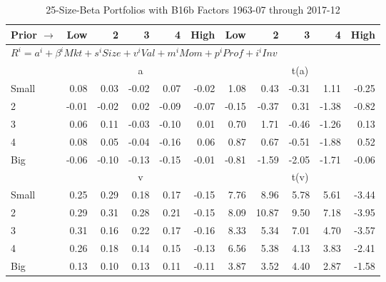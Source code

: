 
\begin{table}[!ht]
\footnotesize
\centering
\caption{25-Size-Beta Portfolios with B16b Factors 1963-07 through 2017-12}
\begin{tabular}{lrrrrrrrrrr}
  \toprule
    Prior $\rightarrow$ & Low & 2 & 3 & 4 & High & Low & 2 & 3 & 4 & High \\ 
  \midrule
  \multicolumn{11}{l}{$R^i=a^i+\beta^iMkt+s^iSize+v^iVal+m^iMom+p^iProf+i^iInv$} \\

  
    
      & \multicolumn{5}{c}{a} & \multicolumn{5}{c}{t(a)}
    
    \\
      \cmidrule(r){2-6} \cmidrule(r){7-11}

    Small   & 0.08  & 0.03  & -0.02  & 0.07  & -0.02  & 1.08  & 0.43  & -0.31  & 1.11  & -0.25  \\
         2  & -0.01  & -0.02  & 0.02  & -0.09  & -0.07  & -0.15  & -0.37  & 0.31  & -1.38  & -0.82  \\
         3  & 0.06  & 0.11  & -0.03  & -0.10  & 0.01  & 0.70  & 1.71  & -0.46  & -1.26  & 0.13  \\
         4  & 0.08  & 0.05  & -0.04  & -0.16  & 0.06  & 0.87  & 0.67  & -0.51  & -1.88  & 0.52  \\
    Big     & -0.06  & -0.10  & -0.13  & -0.15  & -0.01  & -0.81  & -1.59  & -2.05  & -1.71  & -0.06  \\

  
    
      & \multicolumn{5}{c}{v} & \multicolumn{5}{c}{t(v)}
    
    \\
      \cmidrule(r){2-6} \cmidrule(r){7-11}

    Small   & 0.25  & 0.29  & 0.18  & 0.17  & -0.15  & 7.76  & 8.96  & 5.78  & 5.61  & -3.44  \\
         2  & 0.29  & 0.31  & 0.28  & 0.21  & -0.15  & 8.09  & 10.87  & 9.50  & 7.18  & -3.95  \\
         3  & 0.31  & 0.16  & 0.22  & 0.17  & -0.16  & 8.33  & 5.34  & 7.01  & 4.70  & -3.57  \\
         4  & 0.26  & 0.18  & 0.14  & 0.15  & -0.13  & 6.56  & 5.38  & 4.13  & 3.83  & -2.41  \\
    Big     & 0.13  & 0.10  & 0.13  & 0.11  & -0.11  & 3.87  & 3.52  & 4.40  & 2.87  & -1.58  \\

  
    

\end{tabular}
\end{table}

